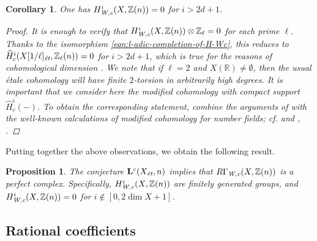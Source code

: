 \documentclass[leqno,12pt]{article}
\theoremstyle{plain}
\newtheorem{corollary}[theorem]{\indent\sc Corollary}
\newtheorem{proposition}[theorem]{\indent\sc Proposition}
\theoremstyle{definition}
\newcommand{\RR}{\mathbb{R}}
\newcommand{\ZZ}{\mathbb{Z}}
\newcommand{\Wc}{\text{\it W,c}}
\newcommand{\et}{\text{\it \'{e}t}}
\begin{document}
\begin{corollary}
  One has $H^i_\Wc (X, \ZZ(n)) = 0$ for $i > 2d+1$.

  \begin{proof}
    It is enough to verify that $H^i_\Wc (X, \ZZ(n)) \otimes \ZZ_\ell = 0$
    for each prime $\ell$. Thanks to the isomorphism
    \eqref{eqn:l-adic-completion-of-H-Wc}, this reduces to
    $\widehat{H}_c^i (X [1/\ell]_\et, \ZZ_\ell (n)) = 0$ for $i > 2d+1$,
    which is true for the reasons of cohomological dimension
    \cite[Expos\'{e}~X, Th\'{e}or\`{e}me~6.2]{SGA4}. We note that if $\ell = 2$ and
    $X (\RR) \ne \emptyset$, then the usual \'{e}tale cohomology will have finite
    $2$-torsion in arbitrarily high degrees. It is important that we consider
    here the \emph{modified} cohomology with compact support
    $\widehat{H}_c^i (-)$. To obtain the corresponding statement, combine the
    arguments of \cite[Expos\'{e}~X]{SGA4} with the well-known calculations of
    modified cohomology for number fields; cf. \cite[Chapter~II]{Milne-ADT} and
    \cite{Artin-Verdier-1964}, \cite{Mazur-1973}.
  \end{proof}
\end{corollary}

Putting together the above observations, we obtain the following result.

\begin{proposition}
  \label{prop:RGammaWc-perfect}
  The conjecture $\mathbf{L}^c (X_\et,n)$ implies that $R\Gamma_\Wc (X, \ZZ(n))$
  is a perfect complex. Specifically, $H^i_\Wc (X, \ZZ(n))$ are finitely
  generated groups, and $H^i_\Wc (X, \ZZ(n)) = 0$ for
  $i \notin [0, 2\dim X + 1]$.
\end{proposition}

\subsection*{Rational coefficients}
\end{document}
